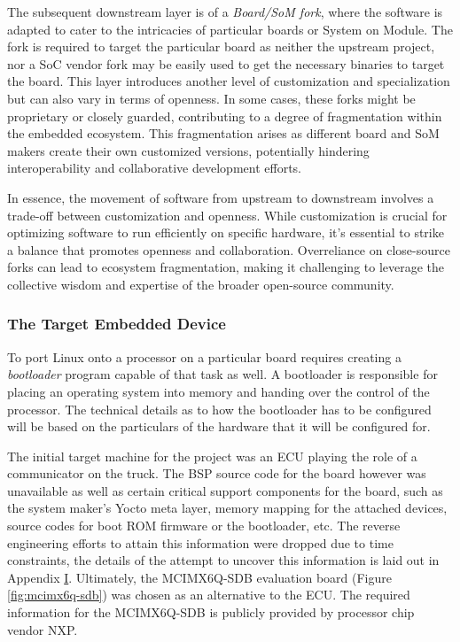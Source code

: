 The subsequent downstream layer is of a \textit{Board/SoM fork}, where the software is adapted to cater to the intricacies of particular boards or System on Module. The fork is required to target the particular board as neither the upstream project, nor a SoC vendor fork may be easily used to get the necessary binaries to target the board. This layer introduces another level of customization and specialization but can also vary in terms of openness. In some cases, these forks might be proprietary or closely guarded, contributing to a degree of fragmentation within the embedded ecosystem. This fragmentation arises as different board and SoM makers create their own customized versions, potentially hindering interoperability and collaborative development efforts.

In essence, the movement of software from upstream to downstream involves a trade-off between customization and openness. While customization is crucial for optimizing software to run efficiently on specific hardware, it's essential to strike a balance that promotes openness and collaboration. Overreliance on close-source forks can lead to ecosystem fragmentation, making it challenging to leverage the collective wisdom and expertise of the broader open-source community.

\subsubsection{The Target Embedded Device}

To port Linux onto a processor on a particular board requires creating a \textit{bootloader} program capable of that task as well. A bootloader is responsible for placing an operating system into memory and handing over the control of the processor. The technical details as to how the bootloader has to be configured will be based on the particulars of the hardware that it will be configured for.

The initial target machine for the project was an ECU playing the role of a communicator on the truck. The BSP source code for the board however was unavailable as well as certain critical support components for the board, such as the system maker's Yocto meta layer, memory mapping for the attached devices, source codes for boot ROM firmware or the bootloader, etc. The reverse engineering efforts to attain this information were dropped due to time constraints, the details of the attempt to uncover this information is laid out in Appendix \hyperref[rtc-c300]{I}. Ultimately, the MCIMX6Q-SDB evaluation board (Figure \ref{fig:mcimx6q-sdb}) was chosen as an alternative to the ECU. The required information for the MCIMX6Q-SDB is publicly provided by processor chip vendor NXP.

